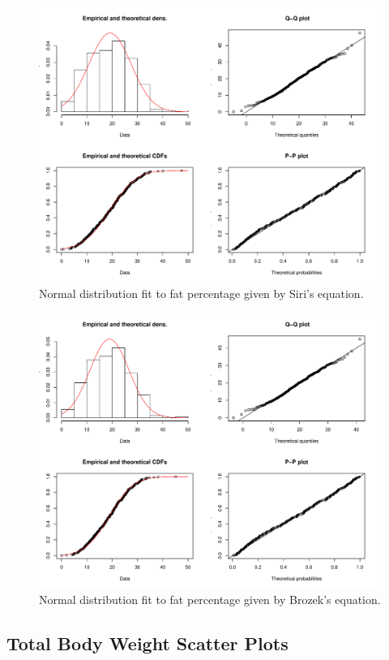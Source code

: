 \documentclass[11pt,american,american]{article}
\begin{document}
\vspace*{\fill}
\begin{figure}[H]
	\centering
	\includegraphics[width=0.8\linewidth]{Images/FIGURES/siri_fitdist}
	\caption{Normal distribution fit to fat percentage given by Siri's equation.}
	\label{fig:siri_fitdist}
\end{figure}

\begin{figure}[H]
	\centering
	\includegraphics[width=0.8\linewidth]{Images/FIGURES/brozek_fitdist}
	\caption{Normal distribution fit to fat percentage given by Brozek's equation.}
	\label{fig:brozek_fitdist}
\end{figure}
\vspace*{\fill}

\newpage


\subsection{Total Body Weight Scatter Plots}\label{sec:total_weight}
\end{document}
